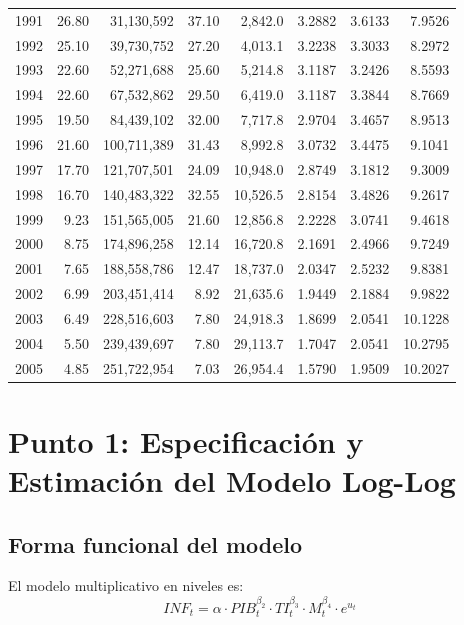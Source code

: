 \documentclass[12pt,a4paper]{article}
\begin{document}
\begin{longtable}{rrrrrrrr}
1991&26.80&31{,}130{,}592&37.10&2{,}842.0&3.2882&3.6133&7.9526\\
1992&25.10&39{,}730{,}752&27.20&4{,}013.1&3.2238&3.3033&8.2972\\
1993&22.60&52{,}271{,}688&25.60&5{,}214.8&3.1187&3.2426&8.5593\\
1994&22.60&67{,}532{,}862&29.50&6{,}419.0&3.1187&3.3844&8.7669\\
1995&19.50&84{,}439{,}102&32.00&7{,}717.8&2.9704&3.4657&8.9513\\
1996&21.60&100{,}711{,}389&31.43&8{,}992.8&3.0732&3.4475&9.1041\\
1997&17.70&121{,}707{,}501&24.09&10{,}948.0&2.8749&3.1812&9.3009\\
1998&16.70&140{,}483{,}322&32.55&10{,}526.5&2.8154&3.4826&9.2617\\
1999&9.23&151{,}565{,}005&21.60&12{,}856.8&2.2228&3.0741&9.4618\\
2000&8.75&174{,}896{,}258&12.14&16{,}720.8&2.1691&2.4966&9.7249\\
2001&7.65&188{,}558{,}786&12.47&18{,}737.0&2.0347&2.5232&9.8381\\
2002&6.99&203{,}451{,}414&8.92&21{,}635.6&1.9449&2.1884&9.9822\\
2003&6.49&228{,}516{,}603&7.80&24{,}918.3&1.8699&2.0541&10.1228\\
2004&5.50&239{,}439{,}697&7.80&29{,}113.7&1.7047&2.0541&10.2795\\
2005&4.85&251{,}722{,}954&7.03&26{,}954.4&1.5790&1.9509&10.2027\\
\end{longtable}

\section{Punto 1: Especificación y Estimación del Modelo Log-Log}

\subsection{Forma funcional del modelo}

El modelo multiplicativo en niveles es:
\begin{equation}
INF_t = \alpha\cdot PIB_t^{\beta_2}\cdot TI_t^{\beta_3}\cdot M_t^{\beta_4}\cdot e^{u_t}
\end{equation}
\end{document}
